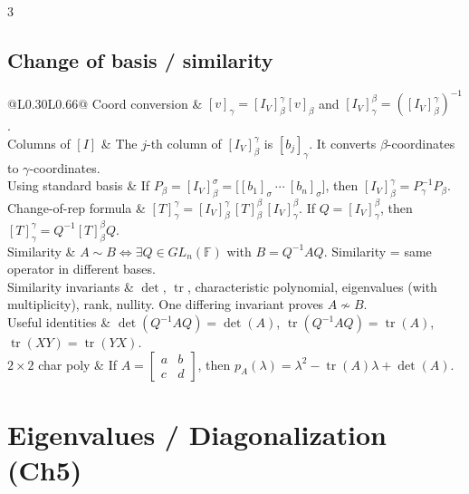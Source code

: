 \documentclass[10pt]{article}
\makeatletter
\newcommand{\F}{\mathbb{F}}
\newcommand{\tr}{\operatorname{tr}}
\newcommand{\cheattable}[1]{\begin{tabular}{@{}L{0.30\columnwidth}L{0.66\columnwidth}@{}}#1\end{tabular}}
\makeatother
\begin{document}
\begin{multicols}{3}
\subsection*{Change of basis / similarity}
\cheattable{
Coord conversion & $[v]_\gamma=[I_V]^\gamma_\beta[v]_\beta$ and $[I_V]^\beta_\gamma=([I_V]^\gamma_\beta)^{-1}$.\\
Columns of $[I]$ & The $j$-th column of $[I_V]^\gamma_\beta$ is $[b_j]_\gamma$. It converts $\beta$-coordinates to $\gamma$-coordinates.\\
Using standard basis & If $P_\beta=[I_V]^\sigma_\beta=\bigl[[b_1]_\sigma\ \cdots\ [b_n]_\sigma\bigr]$, then $[I_V]^\gamma_\beta=P_\gamma^{-1}P_\beta$.\\
Change-of-rep formula & $[T]^\gamma_\gamma=[I_V]^\gamma_\beta\,[T]^\beta_\beta\,[I_V]^\beta_\gamma$. If $Q=[I_V]^\beta_\gamma$, then $[T]^\gamma_\gamma=Q^{-1}[T]^\beta_\beta Q$.\\
Similarity & $A\sim B \iff \exists Q\in GL_n(\F)$ with $B=Q^{-1}AQ$. Similarity = same operator in different bases.\\
Similarity invariants & $\det$, $\tr$, characteristic polynomial, eigenvalues (with multiplicity), rank, nullity. One differing invariant proves $A\not\sim B$.\\
Useful identities & $\det(Q^{-1}AQ)=\det(A)$, $\tr(Q^{-1}AQ)=\tr(A)$, $\tr(XY)=\tr(YX)$.\\
$2\times2$ char poly & If $A=\begin{bmatrix}a&b\\ c&d\end{bmatrix}$, then $p_A(\lambda)=\lambda^2-\tr(A)\lambda+\det(A)$.\\
}

\section*{Eigenvalues / Diagonalization (Ch5)}


\end{multicols}
\end{document}
